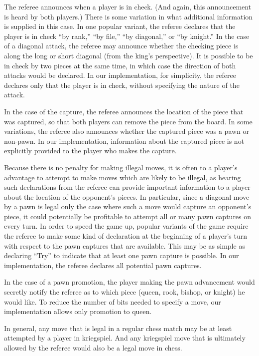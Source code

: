 \documentclass[times, 10pt,twocolumn]{article}
\begin{document}
The referee announces when a player is in check.  (And again, this announcement is heard by both players.)  There is
some variation in what additional information is supplied in this case.  In one popular variant, the referee declares
that the player is in check ``by rank,'' ``by file,'' ``by diagonal,'' or ``by knight.''  In the case of a diagonal attack, the
referee may announce whether the checking piece is along the long or short diagonal (from the king's perspective).  It
is possible to be in check by two pieces at the same time, in which case the direction of both attacks would be
declared.  In our implementation, for simplicity, the referee declares only that the player is in check, without
specifying the nature of the attack.

In the case of the capture, the referee announces the location of the piece that was captured, so that both players can
remove the piece from the board.  In some variations, the referee also announces whether the captured piece was a pawn
or non-pawn.  In our implementation, information about the captured piece is not explicitly provided to the player who
makes the capture.

Because there is no penalty for making illegal moves, it is often to a player's advantage to attempt to make moves which
are likely to be illegal, as hearing such declarations from the referee can provide important information to a player
about the location of the opponent's pieces.  In particular, since a diagonal move by a pawn is legal only the case
where such a move would capture an opponent's piece, it could potentially be profitable to attempt all or many pawn
captures on every turn.  In order to speed the game up, popular variants of the game require the referee to make some
kind of declaration at the beginning of a player's turn with respect to the pawn captures that are available.  This may
be as simple as declaring ``Try'' to indicate that at least one pawn capture is possible.  In our implementation, the
referee declares all potential pawn captures.

In the case of a pawn promotion, the player making the pawn advancement would secretly notify the referee as to which
piece (queen, rook, bishop, or knight) he would like.  To reduce the number of bits needed to specify a move, our
implementation allows only promotion to queen. 

In general, any move that is legal in a regular chess match may be at least attempted by a player in kriegspiel.  And
any kriegspiel move that is ultimately allowed by the referee would also be a legal move in chess.    
\end{document}
